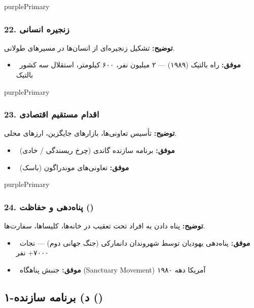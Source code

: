 \documentclass[a4paper,12pt]{article}
\newcommand{\success}[1]{\textcolor{greenPrimary}{\faCheckCircle\ \textbf{موفق:}} #1}
\newcommand{\methodnum}[1]{\textcolor{purpleLight}{\textbf{#1.}}}
\begin{document}
\begin{methodcard}{purplePrimary}
\subsubsection{\methodnum{22} زنجیره انسانی}
\textbf{توضیح:} تشکیل زنجیره‌ای از انسان‌ها در مسیرهای طولانی.

\begin{itemize}[label=\textcolor{greenPrimary}{\faCheckCircle}]
  \item \success{راه بالتیک (۱۹۸۹) — ۲ میلیون نفر، ۶۰۰ کیلومتر، استقلال سه کشور بالتیک}
\end{itemize}
\end{methodcard}

\begin{methodcard}{purplePrimary}
\subsubsection{\methodnum{23} اقدام مستقیم اقتصادی}
\textbf{توضیح:} تأسیس تعاونی‌ها، بازارهای جایگزین، ارزهای محلی.

\begin{itemize}[label=\textcolor{greenPrimary}{\faCheckCircle}]
  \item \success{برنامه سازنده گاندی (چرخ ریسندگی / خادی)}
  \item \success{تعاونی‌های موندراگون (باسک)}
\end{itemize}
\end{methodcard}

\begin{methodcard}{purplePrimary}
\subsubsection{\methodnum{24} پناه‌دهی و حفاظت ()}
\textbf{توضیح:} پناه دادن به افراد تحت تعقیب در خانه‌ها، کلیساها، سفارت‌ها.

\begin{itemize}[label=\textcolor{greenPrimary}{\faCheckCircle}]
  \item \success{پناه‌دهی یهودیان توسط شهروندان دانمارکی (جنگ جهانی دوم) — نجات ۷۰۰۰+ نفر}
  \item \success{جنبش پناهگاه (Sanctuary Movement) آمریکا دهه ۱۹۸۰}
\end{itemize}
\end{methodcard}


\subsection{\textcolor{purplePrimary}{\faCircle[regular]} ۱-د) برنامه سازنده ()}
\end{document}
